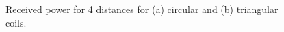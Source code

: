 \documentclass[a4paper,10pt]{article}
\begin{document}
\begin{figure}[tbp]
\begin{center}
 \caption{Received power for 4 distances for (a) circular and (b) triangular coils.}\label{fig:exp_5}
\end{center}
\end{figure}
\end{document}
